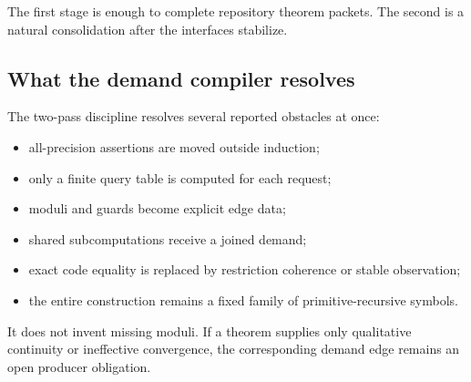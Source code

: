 The first stage is enough to complete repository theorem packets.  The second is a natural consolidation after the interfaces stabilize.

\subsection{What the demand compiler resolves}

The two-pass discipline resolves several reported obstacles at once:

\begin{itemize}
\item all-precision assertions are moved outside induction;
\item only a finite query table is computed for each request;
\item moduli and guards become explicit edge data;
\item shared subcomputations receive a joined demand;
\item exact code equality is replaced by restriction coherence or stable observation;
\item the entire construction remains a fixed family of primitive-recursive symbols.
\end{itemize}

It does not invent missing moduli.  If a theorem supplies only qualitative continuity or ineffective convergence, the corresponding demand edge remains an open producer obligation.
